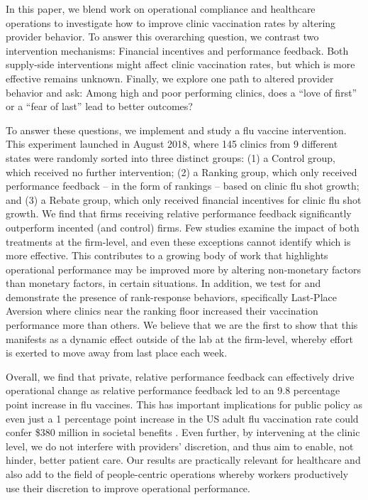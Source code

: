  In this paper, we blend work on operational compliance and healthcare operations to investigate how to improve clinic vaccination rates by altering provider behavior. To answer this overarching question, we contrast two intervention mechanisms: Financial incentives and performance feedback. Both supply-side interventions might affect clinic vaccination rates, but which is more effective remains unknown. Finally, we explore one path to altered provider behavior and ask: Among high and poor performing clinics, does a “love of first” or a “fear of last” lead to better outcomes?
 
 To answer these questions, we implement and study a flu vaccine intervention. This experiment launched in August 2018, where 145 clinics from 9 different states were randomly sorted into three distinct groups: (1) a Control group, which received no further intervention; (2) a Ranking group, which only received performance feedback – in the form of rankings – based on clinic flu shot growth; and (3) a Rebate group, which only received financial incentives for clinic flu shot growth. We find that firms receiving relative performance feedback significantly outperform incented (and control) firms. Few studies examine the impact of both treatments at the firm-level, and even these exceptions cannot identify which is more effective. This contributes to a growing body of work that highlights operational performance may be improved more by altering non-monetary factors than monetary factors, in certain situations. In addition, we test for and demonstrate the presence of rank-response behaviors, specifically Last-Place Aversion where clinics near the ranking floor increased their vaccination performance more than others. We believe that we are the first to show that this manifests as a dynamic effect outside of the lab at the firm-level, whereby effort is exerted to move away from last place each week.
 
 Overall, we find that private, relative performance feedback can effectively drive operational change as relative performance feedback led to an 9.8 percentage point increase in flu vaccines. This has important implications for public policy as even just a 1 percentage point increase in the US adult flu vaccination rate could confer \$380 million in societal benefits \citep{White2021}. Even further, by intervening at the clinic level, we do not interfere with providers’ discretion, and thus aim to enable, not hinder, better patient care. Our results are practically relevant for healthcare and also add to the field of people-centric operations whereby workers productively use their discretion to improve operational performance. 

